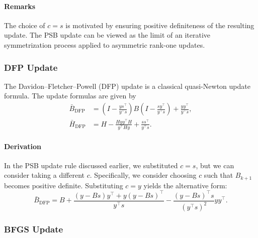 \documentclass[0_en]{subfiles}
\begin{document}
\paragraph{Remarks}

The choice of $c = s$ is motivated by ensuring positive definiteness of the resulting update. The PSB update can be viewed as the limit of an iterative symmetrization process applied to asymmetric rank-one updates.

\subsubsection{DFP Update}

The Davidon--Fletcher--Powell (DFP) update \cite{nocedal1999numerical} is a classical quasi-Newton update formula. The update formulas are given by
\begin{align}
    \bar{B}_{\mathrm{DFP}} & = (I - \frac{y s^\top}{y^\top s}) B (I - \frac{s y^\top}{y^\top s}) + \frac{y y^\top}{y^\top s}, \label{eq:dfp-b-update} \\
    \bar{H}_{\mathrm{DFP}} & = H - \frac{H y y^\top H}{y^\top H y} + \frac{s s^\top}{y^\top s}. \label{eq:dfp-h-update}
\end{align}

\paragraph{Derivation}

In the PSB update rule discussed earlier, we substituted $c=s$, but we can consider taking a different $c$. Specifically, we consider choosing $c$ such that $B_{k+1}$ becomes positive definite. Substituting $c=y$ yields the alternative form:
\begin{equation}\label{eq:dfp-b-alternative}
    \bar{B}_{\mathrm{DFP}} = B + \frac{(y - Bs)y^\top + y(y - Bs)^\top}{y^\top s} - \frac{(y - Bs)^\top s}{(y^\top s)^2} yy^\top.
\end{equation}



\subsubsection{BFGS Update}
\end{document}
